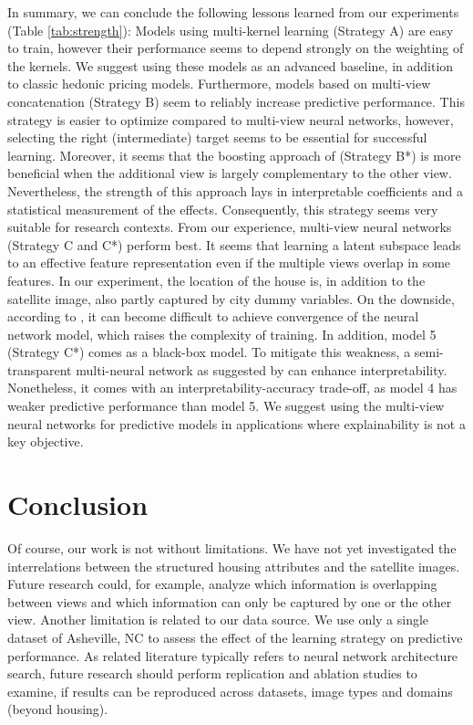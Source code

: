 \documentclass[letterpaper]{article} %
\begin{document}
\vspace{-4.97mm}
In summary, we can conclude the following lessons learned from our experiments (Table \ref{tab:strength}): Models using multi-kernel learning (Strategy A) are easy to train, however their performance seems to depend strongly on the weighting of the kernels. We suggest using these models as an advanced baseline, in addition to classic hedonic pricing models. Furthermore, models based on multi-view concatenation (Strategy B) seem to reliably increase predictive performance. This strategy is easier to optimize compared to multi-view neural networks, however, selecting the right (intermediate) target seems to be essential for successful learning. Moreover, it seems that the boosting approach of \citeauthor{naumzik2020one} \citeyearpar{naumzik2020one} (Strategy B*) is more beneficial when the additional view is largely complementary to the other view. Nevertheless, the strength of this approach lays in interpretable coefficients and a statistical measurement of the effects. Consequently, this strategy seems very suitable for research contexts. From our experience, multi-view neural networks (Strategy C and C*) perform best. It seems that learning a latent subspace leads to an effective feature representation even if the multiple views overlap in some features. In our experiment, the location of the house is, in addition to the satellite image, also partly captured by city dummy variables. On the downside, according to \citeauthor{bency2017beyond} \citeyearpar{bency2017beyond}, it can become difficult to achieve convergence of the neural network model, which raises the complexity of training. In addition, model 5 (Strategy C*) comes as a black-box model. To mitigate this weakness, a semi-transparent multi-neural network as suggested by \citeauthor{law2019take} \citeyearpar{law2019take} can enhance interpretability. Nonetheless, it comes with an interpretability-accuracy trade-off, as model 4 has weaker predictive performance than model 5. We suggest using the multi-view neural networks for predictive models in applications where explainability is not a key objective.

\vspace{-3.05mm}
\section{Conclusion}
Of course, our work is not without limitations. We have not yet investigated the interrelations between the structured housing attributes and the satellite images. Future research could, for example, analyze which information is overlapping between views and which information can only be captured by one or the other view. Another limitation is related to our data source. We use only a single dataset of Asheville, NC to assess the effect of the learning strategy on predictive performance. As related literature typically refers to neural network architecture search, future research should perform replication and ablation studies to examine, if results can be reproduced across datasets, image types and domains (beyond housing).
\end{document}
